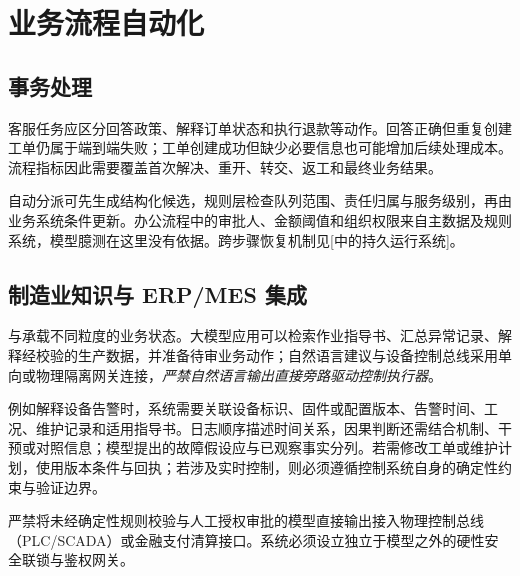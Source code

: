 \documentclass[../textbook.tex]{subfiles}
\begin{document}
\section{业务流程自动化}
\optional
\subsection{事务处理}
客服任务应区分回答政策、解释订单状态和执行退款等动作。回答正确但重复创建工单仍属于端到端失败；工单创建成功但缺少必要信息也可能增加后续处理成本。流程指标因此需要覆盖首次解决、重开、转交、返工和最终业务结果。

自动分派可先生成结构化候选，规则层检查队列范围、责任归属与服务级别，再由业务系统条件更新。办公流程中的审批人、金额阈值和组织权限来自主数据及规则系统，模型臆测在这里没有依据。跨步骤恢复机制见[中的持久运行系统]。

\subsection{制造业知识与 ERP/MES 集成}
与承载不同粒度的业务状态。大模型应用可以检索作业指导书、汇总异常记录、解释经校验的生产数据，并准备待审业务动作；自然语言建议与设备控制总线采用单向或物理隔离网关连接，\emph{严禁自然语言输出直接旁路驱动控制执行器}。

例如解释设备告警时，系统需要关联设备标识、固件或配置版本、告警时间、工况、维护记录和适用指导书。日志顺序描述时间关系，因果判断还需结合机制、干预或对照信息；模型提出的故障假设应与已观察事实分列。若需修改工单或维护计划，使用版本条件与回执；若涉及实时控制，则必须遵循控制系统自身的确定性约束与验证边界。

\begin{warning}[工业与金融关键动作的执行边界]
严禁将未经确定性规则校验与人工授权审批的模型直接输出接入物理控制总线（PLC/SCADA）或金融支付清算接口。系统必须设立独立于模型之外的硬性安全联锁与鉴权网关。
\end{warning}
\end{document}
